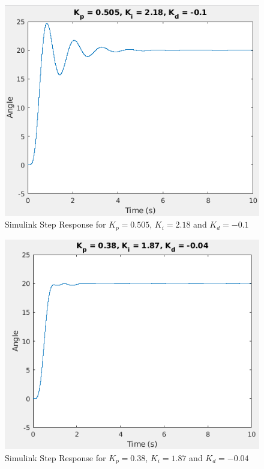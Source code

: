 \documentclass[a4paper, 11pt, compsoc]{IEEEtran}
\begin{document}
				\begin{figure}[!ht]
					\centering
					\includegraphics[width=\columnwidth]{lab6pid1.png}
					\caption{Simulink Step Response for $K_p = 0.505$, $K_i = 2.18$ and $K_d = -0.1$}
					\label{fig:lab6pid1}
				\end{figure}

				\begin{figure}[!ht]
					\centering
					\includegraphics[width=\columnwidth]{lab6pid2.png}
					\caption{Simulink Step Response for $K_p = 0.38$, $K_i = 1.87$ and $K_d = -0.04$}
					\label{fig:lab6pid2}
				\end{figure}
\end{document}
